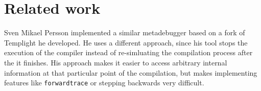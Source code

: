 
\chapter{Related work}

Sven Mikael Persson implemented a similar metadebugger based on a fork of
Templight he developed.\cite{persson-templight} He uses a different approach,
since his tool stops the execution of the compiler instead of re-simluating
the compilation process after the it finishes. His approach makes it easier to
access arbitrary internal information at that particular point of the
compilation, but makes implementing features like \texttt{forwardtrace} or
stepping backwards very difficult.
